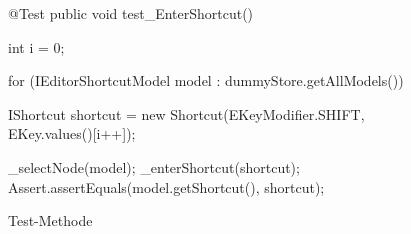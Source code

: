 \begin{wrapfigure}[11]{l}[0px]{322px}
    \centering
	\vspace{-12px}
	\begin{spacing}{0.75}
		\begin{javacode}[firstnumber=41]
@Test
public void test_EnterShortcut()
{
  int i = 0;
  
  for (IEditorShortcutModel model : dummyStore.getAllModels())
  {
    IShortcut shortcut = new Shortcut(EKeyModifier.SHIFT,
                                      EKey.values()[i++]);
    
    _selectNode(model);
    _enterShortcut(shortcut);
    Assert.assertEquals(model.getShortcut(), shortcut);
  }
}\end{javacode}
	\end{spacing}
	\caption{Test-Methode}
	\label{fig:Test-ShortcutEditor-EnterShortcut}
\end{wrapfigure}